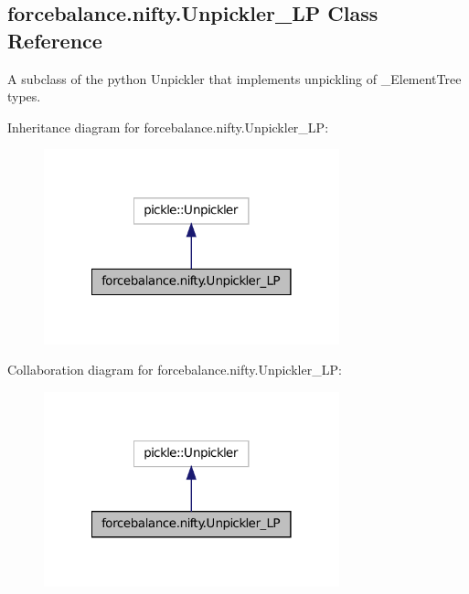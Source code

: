 \hypertarget{classforcebalance_1_1nifty_1_1Unpickler__LP}{\subsection{forcebalance.\-nifty.\-Unpickler\-\_\-\-L\-P Class Reference}
\label{classforcebalance_1_1nifty_1_1Unpickler__LP}
}


A subclass of the python Unpickler that implements unpickling of \-\_\-\-Element\-Tree types.  




Inheritance diagram for forcebalance.\-nifty.\-Unpickler\-\_\-\-L\-P\-:\nopagebreak
\begin{figure}[H]
\begin{center}
\leavevmode
\includegraphics[width=242pt]{classforcebalance_1_1nifty_1_1Unpickler__LP__inherit__graph}
\end{center}
\end{figure}


Collaboration diagram for forcebalance.\-nifty.\-Unpickler\-\_\-\-L\-P\-:\nopagebreak
\begin{figure}[H]
\begin{center}
\leavevmode
\includegraphics[width=242pt]{classforcebalance_1_1nifty_1_1Unpickler__LP__coll__graph}
\end{center}
\end{figure}
